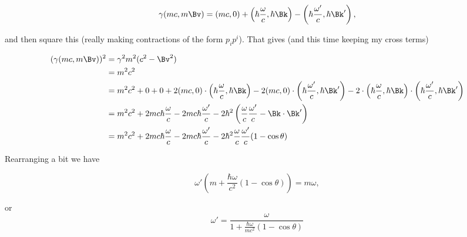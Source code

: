\begin{equation}\label{eqn:relativisticElectrodynamicsExamReflection:n}
\gamma (m c, m \Bv) =
(m c, 0) + \left(\hbar \frac{\omega}{c}, \hbar \Bk \right)
-\left(\hbar \frac{\omega'}{c}, \hbar \Bk' \right),
\end{equation}

and then square this (really making contractions of the form $p_i p^i$).  That gives (and this time keeping my cross terms)

\begin{align*}
(\gamma (m c, m \Bv) )^2 
&= \gamma^2 m^2 (c^2 - \Bv^2) \\
&= m^2 c^2 \\
&=
m^2 c^2 + 0 + 0
+ 2 (m c, 0) 
\cdot \left(\hbar \frac{\omega}{c}, \hbar \Bk \right)
- 2 (m c, 0) \cdot \left(\hbar \frac{\omega'}{c}, \hbar \Bk' \right)
- 2 
\cdot \left(\hbar \frac{\omega}{c}, \hbar \Bk \right)
\cdot \left(\hbar \frac{\omega'}{c}, \hbar \Bk' \right) \\
&=
m^2 c^2 + 2 m c \hbar \frac{\omega}{c} - 2 m c \hbar \frac{\omega'}{c}
- 2\hbar^2 \left(
\frac{\omega}{c} \frac{\omega'}{c}
- 
\Bk \cdot \Bk'
\right) \\
&=
m^2 c^2 + 2 m c \hbar \frac{\omega}{c} - 2 m c \hbar \frac{\omega'}{c}
- 2\hbar^2 
\frac{\omega}{c} \frac{\omega'}{c} (1 - \cos\theta)
\end{align*}

Rearranging a bit we have

\begin{equation}\label{eqn:relativisticElectrodynamicsExamReflection:n}
\omega' \left( m + \frac{\hbar \omega}{c^2} ( 1 - \cos\theta ) \right) = m \omega,
\end{equation}

or
\begin{equation}\label{eqn:relativisticElectrodynamicsExamReflection:n}
\omega' = \frac{\omega}{
1 + \frac{\hbar \omega}{m c^2} ( 1 - \cos\theta ) 
}
\end{equation}

\EndNoBibArticle
